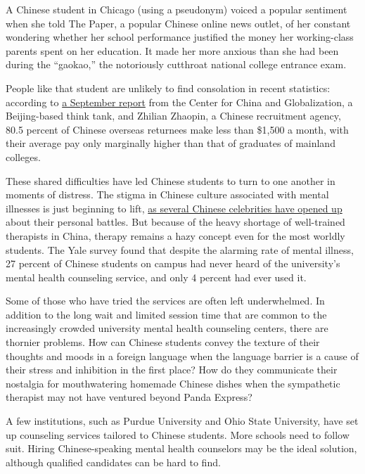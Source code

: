 A Chinese student in Chicago (using a pseudonym) voiced a popular
sentiment when she told The Paper, a popular Chinese online news outlet,
of her constant wondering whether her school performance justified the
money her working-class parents spent on her education. It made her more
anxious than she had been during the ``gaokao,'' the notoriously
cutthroat national college entrance exam.

People like that student are unlikely to find consolation in recent
statistics: according to
\href{http://en.ccg.org.cn/report-on-employment-entrepreneurship-of-chinese-returnees-2017/}{a
September report} from the Center for China and Globalization, a
Beijing-based think tank, and Zhilian Zhaopin, a Chinese recruitment
agency, 80.5 percent of Chinese overseas returnees make less than
\$1,500 a month, with their average pay only marginally higher than that
of graduates of mainland colleges.

These shared difficulties have led Chinese students to turn to one
another in moments of distress. The stigma in Chinese culture associated
with mental illnesses is just beginning to lift,
\href{http://www.bjreview.com.cn/quotes/txt/2014-06/16/content_624279.htm}{as
several Chinese celebrities have opened up} about their personal
battles. But because of the heavy shortage of well-trained therapists in
China, therapy remains a hazy concept even for the most worldly
students. The Yale survey found that despite the alarming rate of mental
illness, 27 percent of Chinese students on campus had never heard of the
university's mental health counseling service, and only 4 percent had
ever used it.

Some of those who have tried the services are often left underwhelmed.
In addition to the long wait and limited session time that are common to
the increasingly crowded university mental health counseling centers,
there are thornier problems. How can Chinese students convey the texture
of their thoughts and moods in a foreign language when the language
barrier is a cause of their stress and inhibition in the first place?
How do they communicate their nostalgia for mouthwatering homemade
Chinese dishes when the sympathetic therapist may not have ventured
beyond Panda Express?

A few institutions, such as Purdue University and Ohio State University,
have set up counseling services tailored to Chinese students. More
schools need to follow suit. Hiring Chinese-speaking mental health
counselors may be the ideal solution, although qualified candidates can
be hard to find.

